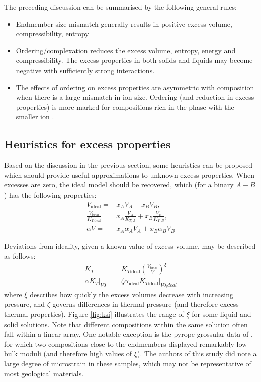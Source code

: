 The preceding discussion can be summarised by the following general rules:
\begin{itemize}
\item Endmember size mismatch generally results in positive excess volume, compressibility, entropy
\item Ordering/complexation reduces the excess volume, entropy, energy and compressibility. The excess properties in both solids and liquids may become negative with sufficiently strong interactions.
\item The effects of ordering on excess properties are asymmetric with composition when there is a large mismatch in ion size. Ordering (and reduction in excess properties) is more marked for compositions rich in the phase with the smaller ion \citep{NW1980}.
\end{itemize}

\subsection{Heuristics for excess properties}

Based on the discussion in the previous section, some heuristics can be proposed which should provide useful approximations to unknown excess properties. When excesses are zero, the ideal model should be recovered, which (for a binary $A-B$) has the following properties:
\begin{eqnarray}
V_{\textrm{ideal}} =& x_AV_A + x_BV_B,\\
\frac{V_{\textrm{ideal}}}{K_{T\textrm{ideal}}} =& x_A\frac{V_{A}}{K_{T, A}} + x_B\frac{V_{B}}{K_{T, B}}, \\
\alpha V =& x_A\alpha_A V_A + x_B\alpha_B V_B 
\end{eqnarray}

Deviations from ideality, given a known value of excess volume, may be described as follows:
\begin{eqnarray}
K_T =& K_{T\textrm{ideal}} \left(\frac{V_{\textrm{ideal}}}{V}\right)^{\xi} \label{eqn:KV_relation} \\
\alpha K_T |_{V0} =& \zeta \alpha_{\textrm{ideal}} K_{T\textrm{ideal}} |_{V0_ideal}
\end{eqnarray}
\noindent where $\xi$ describes how quickly the excess volumes decrease with increasing pressure, and $\zeta$ governs differences in thermal pressure (and therefore excess thermal properties). Figure \ref{fig:ksi} illustrates the range of $\xi$ for some liquid and solid solutions. Note that different compositions within the same solution often fall within a linear array. One notable exception is the pyrope-grossular data of \cite{DCW2015}, for which two compositions close to the endmembers displayed remarkably low bulk moduli (and therefore high values of $\xi$). The authors of this study did note a large degree of microstrain in these samples, which may not be representative of most geological materials. 

